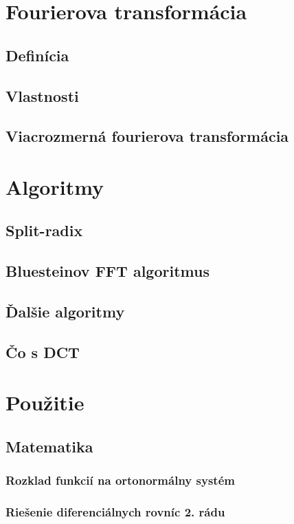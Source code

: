 

\chapter{Fourierova transformácia}
\section{Definícia}
\section{Vlastnosti}
\section{Viacrozmerná fourierova transformácia}

\chapter{Algoritmy}
    
    
    \section{Split-radix}
    \section{Bluesteinov FFT algoritmus}
    \section{Ďalšie algoritmy}
    \section{Čo s DCT}


\chapter{Použitie}
\section{Matematika}
    \subsection{Rozklad funkcií na ortonormálny systém}
    \subsection{Riešenie diferenciálnych rovníc 2. rádu}
    
